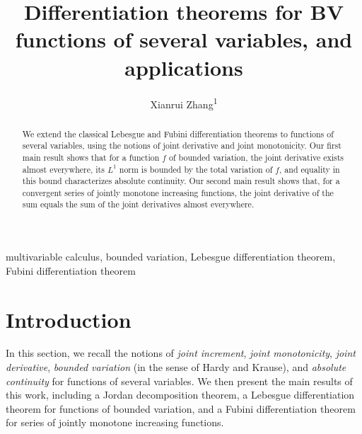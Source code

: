 \documentclass{ijclclp}
\title{Differentiation theorems for BV functions of several variables, and applications}
\author{Xianrui Zhang\textsuperscript{1}}
\affiliation{Department of Mathematics, Sun Yat-sen University, Guangzhou, China}
\begin{document}
\maketitle
\thispagestyle{firstpage}
\begin{abstract} 
We extend the classical Lebesgue and Fubini differentiation theorems to functions of several variables, using the notions of joint derivative and joint monotonicity. Our first main result shows that for a function $f$ of bounded variation, the joint derivative exists almost everywhere, its $L^1$ norm is bounded by the total variation of $f$, and equality in this bound characterizes absolute continuity. Our second main result shows that, for a convergent series of jointly monotone increasing functions, the joint derivative of the sum equals the sum of the joint derivatives almost everywhere.
\end{abstract} 

\begin{keywords}
multivariable calculus, bounded variation, Lebesgue differentiation theorem, Fubini differentiation theorem
\end{keywords}


\section{Introduction}
In this section, we recall the notions of \textit{joint increment}, \textit{joint monotonicity}, \textit{joint derivative}, \textit{bounded variation} (in the sense of Hardy and Krause), and \textit{absolute continuity} for functions of several variables. We then present the main results of this work, including a Jordan decomposition theorem, a Lebesgue differentiation theorem for functions of bounded variation, and a Fubini differentiation theorem for series of jointly monotone increasing functions. 
\end{document}

